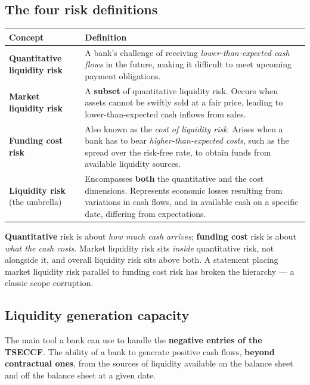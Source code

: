\subsection{The four risk definitions}

\begin{center}
\small
\begin{tabularx}{\textwidth}{@{}p{3.7cm} X@{}}
\toprule
\rowcolor{FRMSoft}\textbf{Concept} & \textbf{Definition} \\
\midrule
\textbf{Quantitative liquidity risk} & A bank's challenge of receiving \emph{lower-than-expected cash flows} in the future, making it difficult to meet upcoming payment obligations. \\
\addlinespace
\textbf{Market liquidity risk} & A \textbf{subset} of quantitative liquidity risk. Occurs when assets cannot be swiftly sold at a fair price, leading to lower-than-expected cash inflows from sales. \\
\addlinespace
\textbf{Funding cost risk} & Also known as the \emph{cost of liquidity risk}. Arises when a bank has to bear \emph{higher-than-expected costs}, such as the spread over the risk-free rate, to obtain funds from available liquidity sources. \\
\addlinespace
\textbf{Liquidity risk} (the umbrella) & Encompasses \textbf{both} the quantitative and the cost dimensions. Represents economic losses resulting from variations in cash flows, and in available cash on a specific date, differing from expectations. \\
\bottomrule
\end{tabularx}
\end{center}

\begin{lrtrapbox}
\textbf{Quantitative} risk is about \emph{how much cash arrives}; \textbf{funding cost} risk is about \emph{what the cash costs}. Market liquidity risk sits \emph{inside} quantitative risk, not alongside it, and overall liquidity risk sits above both. A statement placing market liquidity risk parallel to funding cost risk has broken the hierarchy --- a classic scope corruption.
\end{lrtrapbox}

\subsection{Liquidity generation capacity}

\begin{lrdefbox}
The main tool a bank can use to handle the \textbf{negative entries of the TSECCF}. The ability of a bank to generate positive cash flows, \textbf{beyond contractual ones}, from the sources of liquidity available on the balance sheet and off the balance sheet at a given date.
\end{lrdefbox}

